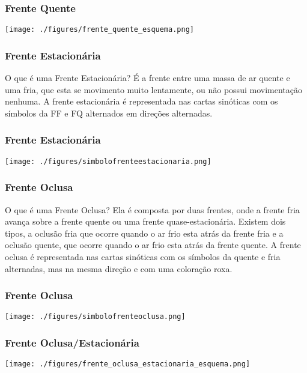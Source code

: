 \begin{frame}
\frametitle{Frente Quente}
  \begin{center}
    \texttt{[image: ./figures/frente\_quente\_esquema.png]}
  \end{center}
\end{frame}


\begin{frame}
\frametitle{Frente Estacionária}
\begin{block}{O que é uma Frente Estacionária?}
  É a frente entre uma massa de ar quente e uma fria, que esta se movimento
  muito lentamente, ou não possui movimentação nenhuma.  A frente estacionária
  é representada nas cartas sinóticas com os símbolos da FF e FQ alternados em
  direções alternadas.
\end{block}
\end{frame}


\begin{frame}
\frametitle{Frente Estacionária}
  \begin{center}
    \texttt{[image: ./figures/simbolofrenteestacionaria.png]}
  \end{center}
\end{frame}


\begin{frame}
\frametitle{Frente Oclusa}
\begin{block}{O que é uma Frente Oclusa?}
  Ela é composta por duas frentes, onde a frente fria avança sobre a frente
  quente ou uma frente quase-estacionária.  Existem dois tipos, a oclusão fria
  que ocorre quando o ar frio esta atrás da frente fria e a oclusão quente, que
  ocorre quando o ar frio esta atrás da frente quente.  A frente oclusa é
  representada nas cartas sinóticas com os símbolos da quente e fria alternadas,
  mas na mesma direção e com uma coloração roxa.
\end{block}
\end{frame}


\begin{frame}
\frametitle{Frente Oclusa}
  \begin{center}
    \texttt{[image: ./figures/simbolofrenteoclusa.png]}
  \end{center}
\end{frame}

\begin{frame}
\frametitle{Frente Oclusa/Estacionária}
  \begin{center}
    \texttt{[image: ./figures/frente\_oclusa\_estacionaria\_esquema.png]}
  \end{center}
\end{frame}


